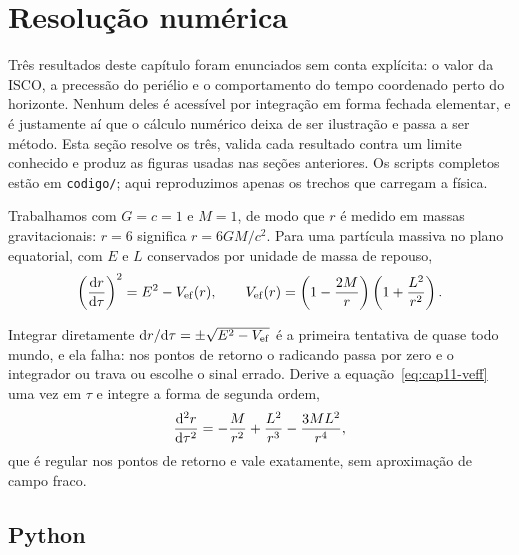 \section{Resolução numérica}
\label{sec:cap10-numerica}

Três resultados deste capítulo foram enunciados sem conta explícita: o valor
da ISCO, a precessão do periélio e o comportamento do tempo coordenado perto
do horizonte. Nenhum deles é acessível por integração em forma fechada
elementar, e é justamente aí que o cálculo numérico deixa de ser ilustração e
passa a ser método. Esta seção resolve os três, valida cada resultado contra
um limite conhecido e produz as figuras usadas nas seções anteriores. Os
scripts completos estão em \texttt{codigo/}; aqui reproduzimos apenas os
trechos que carregam a física.

Trabalhamos com $G = c = 1$ e $M = 1$, de modo que $r$ é medido em massas
gravitacionais: $r = 6$ significa $r = 6GM/c^2$. Para uma partícula massiva
no plano equatorial, com $E$ e $L$ conservados por unidade de massa de
repouso,
\begin{equation}
  \left(\frac{\mathrm{d} r}{\mathrm{d} \tau}\right)^{2} = E^{2} - V_{\mathrm{ef}}(r),
  \qquad
  V_{\mathrm{ef}}(r) = \left(1 - \frac{2M}{r}\right)\left(1 + \frac{L^{2}}{r^{2}}\right).
  \label{eq:cap11-veff}
\end{equation}

\begin{atencao}
Integrar diretamente $\mathrm{d} r/\mathrm{d}\tau = \pm\sqrt{E^{2}-V_{\mathrm{ef}}}$ é a primeira
tentativa de quase todo mundo, e ela falha: nos pontos de retorno o radicando
passa por zero e o integrador ou trava ou escolhe o sinal errado. Derive a
equação~\eqref{eq:cap11-veff} uma vez em $\tau$ e integre a forma de segunda
ordem,
\[
  \frac{\mathrm{d} ^{2}r}{\mathrm{d} \tau^{2}} = -\frac{M}{r^{2}} + \frac{L^{2}}{r^{3}}
                          - \frac{3ML^{2}}{r^{4}},
\]
que é regular nos pontos de retorno e vale exatamente, sem aproximação de
campo fraco.
\end{atencao}

\subsection{Python}


